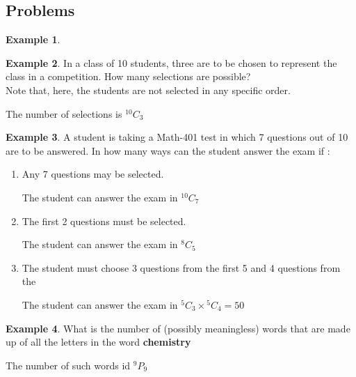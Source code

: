 \documentclass[12pt]{article}
\theoremstyle{definition}
\newtheorem{exmp}{Example}[section]
\newcommand*{\Perm}[2]{{}^{#1}\!P_{#2}}%
\newcommand*{\Comb}[2]{{}^{#1}C_{#2}}%
\begin{document}
\subsection{Problems}
\begin{exmp}

\end{exmp}    
\begin{exmp}
    In a class of 10 students, three are to be chosen to represent the class in a
    competition.  How many selections are possible? \\

    Note that, here, the students are not selected in any 
    specific order.

    The number of selections is $\Comb{10}{3} $

\end{exmp}    

\begin{exmp}
    A student is taking a Math-401 test in which 7 questions out of 10 are to be
    answered. In how many ways can the student answer the exam if :
\end{exmp}    
\begin{enumerate}
    \item Any 7 questions may be selected.
        \begin{center}
            The student can answer the exam in $\Comb{10}{7}$
        \end{center}
    \item The first 2 questions must be selected.
        \begin{center}
            The student can answer the exam in $\Comb{8}{5}$
        \end{center}
    \item The student must choose 3 questions from the first 5 and 4 questions from the
        \begin{center}
            The student can answer the exam in $\Comb{5}{3} \times \Comb{5}{4} = 50$
        \end{center}
\end{enumerate}       


\begin{exmp}
    What is the number of (possibly meaningless) words that are made up of all the
    letters in the word \textbf{chemistry}
\end{exmp}    
\begin{center}
    The number of such words id $\Perm{9}{9}$
\end{center}
\end{document}

